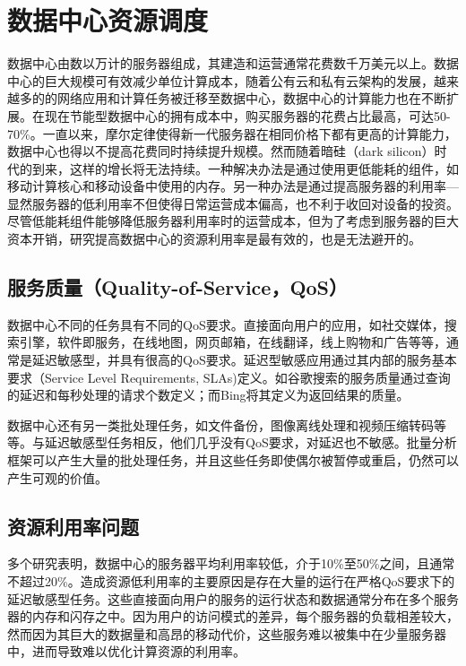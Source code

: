 
\chapter{数据中心资源调度}
数据中心由数以万计的服务器组成，其建造和运营通常花费数千万美元以上。数据中心的巨大规模可有效减少单位计算成本，随着公有云和私有云架构的发展，越来越多的的网络应用和计算任务被迁移至数据中心，数据中心的计算能力也在不断扩展。在现在节能型数据中心的拥有成本中，购买服务器的花费占比最高，可达50-70\%\cite{barroso2013datacenter}。一直以来，摩尔定律使得新一代服务器在相同价格下都有更高的计算能力，数据中心也得以不提高花费同时持续提升规模。然而随着暗硅（dark silicon）时代的到来\cite{esmaeilzadeh2011dark}\cite{hardavellas2011toward}，这样的增长将无法持续。一种解决办法是通过使用更低能耗的组件\cite{lo2014towards}，如移动计算核心\cite{janapa2010web}和移动设备中使用的内存\cite{malladi2012towards}。另一种办法是通过提高服务器的利用率---显然服务器的低利用率不但使得日常运营成本偏高，也不利于收回对设备的投资。尽管低能耗组件能够降低服务器利用率时的运营成本\cite{barroso2007case}，但为了考虑到服务器的巨大资本开销，研究提高数据中心的资源利用率是最有效的，也是无法避开的。

\section{服务质量（Quality-of-Service，QoS）}
数据中心不同的任务具有不同的QoS要求。直接面向用户的应用，如社交媒体，搜索引擎，软件即服务，在线地图，网页邮箱，在线翻译，线上购物和广告等等，通常是延迟敏感型，并具有很高的QoS要求。延迟型敏感应用通过其内部的服务基本要求（Service Level Requirements, SLAs)定义。如谷歌搜索的服务质量通过查询的延迟和每秒处理的请求个数定义；而Bing将其定义为返回结果的质量\cite{janapa2010web}\cite{kozyrakis2010server}。

数据中心还有另一类批处理任务，如文件备份，图像离线处理和视频压缩转码等等。与延迟敏感型任务相反，他们几乎没有QoS要求，对延迟也不敏感。批量分析框架可以产生大量的批处理任务，并且这些任务即使偶尔被暂停或重启，仍然可以产生可观的价值\cite{boutin2014apollo}\cite{carvalho2014long}\cite{curino2014reservation}\cite{delimitrou2014quasar}。

\section{资源利用率问题}
多个研究表明，数据中心的服务器平均利用率较低，介于10\%至50\%之间\cite{kaplan2008revolutionizing}\cite{vasan2010worth}\cite{reiss2012heterogeneity}\cite{barroso2013datacenter}\cite{delimitrou2014quasar}\cite{carvalho2014long}，且通常不超过20\%\cite{barroso2007case}。造成资源低利用率的主要原因是存在大量的运行在严格QoS要求下的延迟敏感型任务。这些直接面向用户的服务的运行状态和数据通常分布在多个服务器的内存和闪存之中。因为用户的访问模式的差异，每个服务器的负载相差较大，然而因为其巨大的数据量和高昂的移动代价，这些服务难以被集中在少量服务器中，进而导致难以优化计算资源的利用率。

